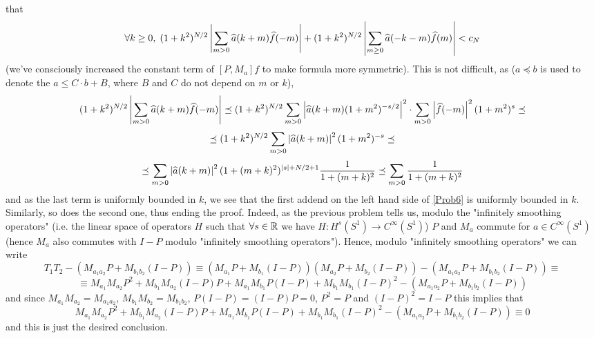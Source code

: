 \documentclass[10pt]{article} %
\def \hat {\widehat}
\begin{document}
that
\begin{equation}\label{Prob6}\forall k\geq0,\;
	(1+k^2)^{ N/2 }\myabs{\sum_{ m>0 }\hat{ a }(k+m)\hat{ f }(-m)}+(1+k^2)^{ N/2 }
	\myabs{\sum_{ m\geq0 }\hat{ a }(-k-m)\hat{ f }(m)}<c_N
\end{equation}
(we've consciously increased the constant term of $[P,M_a]f$ to make formula more symmetric).
This is not difficult, as ($a\preceq b$ is used to denote the $a\leq C\cdot b+B$, where $B$ and $C$ do not depend on $m$ or $k$), 
\[(1+k^2)^{ N/2 }\myabs{\sum_{ m>0 }\hat{ a }(k+m)\hat{ f }(-m)}\preceq
	(1+k^2)^{ N/2 }\sum_{ m>0 }
\myabs{ \hat{ a }(k+m)(1+m^2)^{ -s/2}}^2\cdot\sum_{m>0}\myabs{\hat{f}(-m)}^2(1+m^2)^{ s}\preceq\]
\[\preceq 
(1+k^2)^{ N/2 }\sum_{ m>0 }\myabs{ \hat{ a }(k+m)}^2(1+m^2)^{ -s}\preceq\]
\[\preceq\sum_{ m>0 }\myabs{ \hat{ a }(k+m)}^2(1+(m+k)^2)^{ \myabs{ s }+N/2+1}\frac{ 1 }{ 1+(m+k)^2 }\preceq
	\sum_{ m>0 }\frac{ 1 }{ 1+(m+k)^2 }
\]
and as the last term is uniformly bounded in $k$, we
see that the first addend on the left hand side of \ref{Prob6} is uniformly bounded in $k$. Similarly, so does
the second one, thus ending the proof.
Indeed, as the previous problem tells us, modulo the "infinitely smoothing operators" (i.e. the linear space of operators
$H$ such that $\forall s\in\mathbb{R}$ we have $H:H^s(S^1)\to C^\infty(S^1)$) $P$ and $M_a$ commute for $a\in C^\infty(S^1)$
(hence $M_a$ also commutes with $I-P$ modulo "infinitely smoothing operators"). Hence,
modulo "infinitely smoothing operators" we can write
\[T_1T_2-(M_{ a_1a_2 }P+M_{ b_1b_2 }(I-P))\equiv(M_{ a_1 }P+M_{ b_1 }(I-P))(M_{ a_2 }P+M_{ b_2 }(I-P))
-(M_{ a_1a_2 }P+M_{ b_1b_2 }(I-P))\equiv\]
\[\equiv M_{ a_1 }M_{ a_2 }P^2+M_{ b_1 }M_{ a_2 }(I-P)P+M_{ a_1 }M_{ b_1 }P(I-P)+M_{ b_1 }M_{ b_1 }(I-P)^2
-(M_{ a_1a_2 }P+M_{ b_1b_2 }(I-P))\]
and since $M_{ a_1 }M_{ a_2 }=M_{ a_1a_2 }$, $M_{ b_1 }M_{ b_2 }=M_{ b_1b_2 }$, $P(I-P)=(I-P)P=0$, $P^2=P$ and $(I-P)^2=I-P$
this implies that
\[M_{ a_1 }M_{ a_2 }P^2+M_{ b_1 }M_{ a_2 }(I-P)P+M_{ a_1 }M_{ b_1 }P(I-P)+M_{ b_1 }M_{ b_1 }(I-P)^2-(M_{ a_1a_2 }P+M_{ b_1b_2 }(I-P))\equiv0\]
and this is just the desired conclusion.
\end{document}
